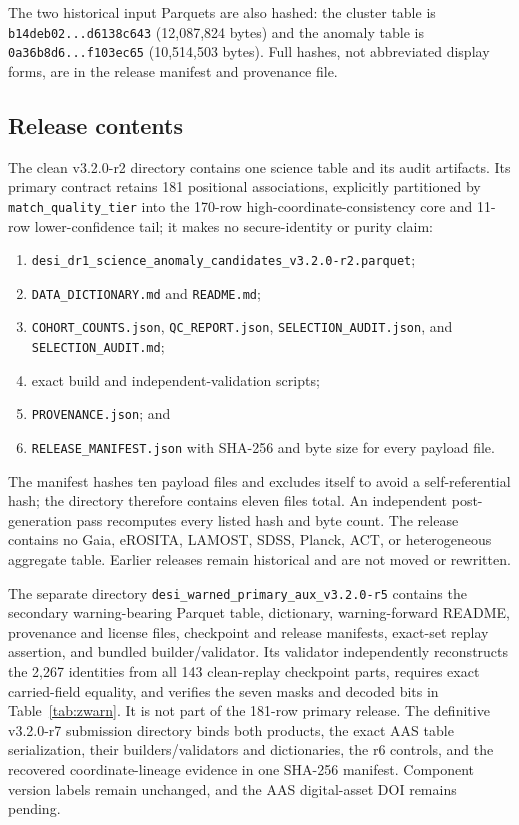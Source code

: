 \documentclass[twocolumn]{aastex701}
\newcommand{\releaseVersion}{v3.2.0-r2}
\newcommand{\bundleVersion}{v3.2.0-r7}
\begin{document}
The two historical input Parquets are also hashed: the cluster table is
\texttt{b14deb02...d6138c643} (12,087,824 bytes) and the anomaly table is
\texttt{0a36b8d6...f103ec65} (10,514,503 bytes).  Full hashes, not abbreviated display forms, are in
the release manifest and provenance file.

\subsection{Release contents}\label{sec:release}

The clean \releaseVersion{} directory contains one science table and its audit artifacts.  Its
primary contract retains 181 positional associations, explicitly partitioned by
\texttt{match\_quality\_tier} into the 170-row high-coordinate-consistency core and 11-row
lower-confidence tail; it makes no secure-identity or purity claim:
\begin{enumerate}
\item \nolinkurl{desi_dr1_science_anomaly_candidates_v3.2.0-r2.parquet};
\item \texttt{DATA\_DICTIONARY.md} and \texttt{README.md};
\item \nolinkurl{COHORT_COUNTS.json}, \nolinkurl{QC_REPORT.json},
\nolinkurl{SELECTION_AUDIT.json}, and \nolinkurl{SELECTION_AUDIT.md};
\item exact build and independent-validation scripts;
\item \texttt{PROVENANCE.json}; and
\item \texttt{RELEASE\_MANIFEST.json} with SHA-256 and byte size for every payload file.
\end{enumerate}
The manifest hashes ten payload files and excludes itself to avoid a self-referential hash;
the directory therefore contains eleven files total.  An independent post-generation
pass recomputes every listed hash and byte count.  The release contains no Gaia, eROSITA, LAMOST,
SDSS, Planck, ACT, or heterogeneous aggregate table.  Earlier releases remain historical and are
not moved or rewritten.

The separate directory \nolinkurl{desi_warned_primary_aux_v3.2.0-r5} contains the secondary
warning-bearing Parquet table, dictionary, warning-forward README, provenance and license files,
checkpoint and release manifests, exact-set replay assertion, and bundled builder/validator.
Its validator independently reconstructs the 2,267 identities from all 143 clean-replay
checkpoint parts, requires exact carried-field equality, and verifies the seven masks and decoded
bits in Table~\ref{tab:zwarn}.  It is not part of the 181-row primary release.  The definitive
\bundleVersion{} submission directory binds both products, the exact AAS table serialization,
their builders/validators and dictionaries, the r6 controls, and the recovered coordinate-lineage
evidence in one SHA-256 manifest.  Component version labels remain unchanged, and the AAS
digital-asset DOI remains pending.
\end{document}
